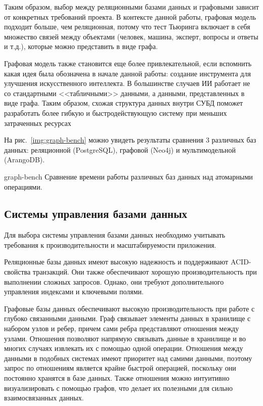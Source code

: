 Таким образом, выбор между реляционными базами данных и графовыми зависит от конкретных требований проекта.
В контексте данной работы, графовая модель подходит больше, чем реляционная, потому что тест Тьюринга включает в себя множество связей между объектами (человек, машина, эксперт, вопросы и ответы и т.д.), которые можно представить в виде графа.

Графовая модель также становится еще более привлекательной, если вспомнить какая идея была обозначена в начале данной работы: создание инструмента для улучшения искусственного интеллекта. В большинстве случаев ИИ работает не со стандартными <<табличными>> данными, а данными, представленных в виде графа. Таким образом, схожая структура данных внутри СУБД поможет разработать более гибкую и быстродействующую систему при меньших затраченных ресурсах

На рис.~\ref{img:graph-bench} можно увидеть результаты сравнения 3 различных баз данных: реляционной (PostgreSQL), графовой (Neo4j) и мультимодельной (ArangoDB).

\img{100mm}
{graph-bench}
{Сравнение времени работы различных баз данных над атомарными операциями.}

\clearpage

\subsection{Системы управления базами данных}

Для выбора системы управления базами данных необходимо учитывать требования к производительности и масштабируемости приложения.

Реляционные базы данных имеют высокую надежность и поддерживают ACID-свойства транзакций. Они также обеспечивают хорошую производительность при выполнении сложных запросов. Однако, они требуют дополнительного управления индексами и ключевыми полями.

Графовые базы данных обеспечивают высокую производительность при работе с глубоко связанными данными. Граф связывает элементы данных в хранилище с набором узлов и ребер, причем сами ребра представляют отношения между узлами. Отношения позволяют напрямую связывать данные в хранилище и во многих случаях извлекать их с помощью одной операции. Отношения между данными в подобных системах имеют приоритет над самими данными, поэтому запрос по отношениям является крайне быстрой операцией, поскольку они постоянно хранятся в базе данных. Также отношения можно интуитивно визуализировать с помощью графов, что делает их полезными для сильно взаимосвязанных данных. 

